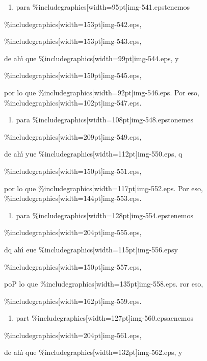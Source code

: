 \documentclass[12pt]{article}
\begin{document}
\begin{enumerate}
	\item para \%includegraphics[width=95pt]{img-541.eps}tenemos
\end{enumerate}

\%includegraphics[width=153pt]{img-542.eps},

\%includegraphics[width=153pt]{img-543.eps},

de ah\'{\i} que \%includegraphics[width=99pt]{img-544.eps}, y

\%includegraphics[width=150pt]{img-545.eps},

por lo que \%includegraphics[width=92pt]{img-546.eps}. Por eso,
\%includegraphics[width=102pt]{img-547.eps}.

\begin{enumerate}
	\item para \%includegraphics[width=108pt]{img-548.eps}tonemes
\end{enumerate}

\%includegraphics[width=209pt]{img-549.eps},

de ah\'{\i} yue \%includegraphics[width=112pt]{img-550.eps}, q

\%includegraphics[width=150pt]{img-551.eps},

por lo que \%includegraphics[width=117pt]{img-552.eps}. Por eso,
\%includegraphics[width=144pt]{img-553.eps}.

\begin{enumerate}
	\item para \%includegraphics[width=128pt]{img-554.eps}tenemos
\end{enumerate}

\%includegraphics[width=204pt]{img-555.eps},

dq ah\'{\i} eue \%includegraphics[width=115pt]{img-556.eps}y

\%includegraphics[width=150pt]{img-557.eps},

poP lo que \%includegraphics[width=135pt]{img-558.eps}. ror eso,

\%includegraphics[width=162pt]{img-559.eps}.

\begin{enumerate}
	\item part \%includegraphics[width=127pt]{img-560.eps}aenemos
\end{enumerate}

\%includegraphics[width=204pt]{img-561.eps},

de ah\'{\i} que \%includegraphics[width=132pt]{img-562.eps}, y
\end{document}
